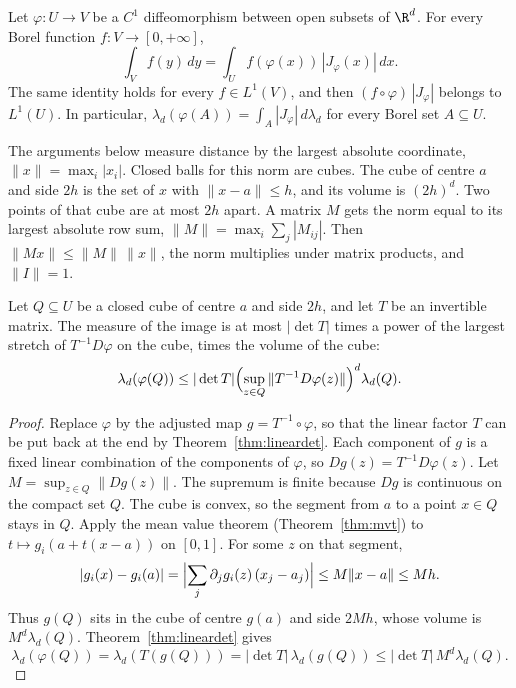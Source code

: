 \begin{theorem}\label{thm:cov}
Let $\varphi:U\to V$ be a $C^1$ diffeomorphism between open subsets of $\R^d$. For every Borel function $f:V\to[0,+\infty]$,
\[\int_Vf(y)\,dy=\int_Uf(\varphi(x))\,|J_\varphi(x)|\,dx.\]
The same identity holds for every $f\in L^1(V)$, and then $(f\circ\varphi)\,|J_\varphi|$ belongs to $L^1(U)$. In particular, $\lambda_d(\varphi(A))=\int_A|J_\varphi|\,d\lambda_d$ for every Borel set $A\subseteq U$.
\end{theorem}

The arguments below measure distance by the largest absolute coordinate, $\|x\|=\max_i|x_i|$. Closed balls for this norm are cubes. The cube of centre $a$ and side $2h$ is the set of $x$ with $\|x-a\|\le h$, and its volume is $(2h)^d$. Two points of that cube are at most $2h$ apart. A matrix $M$ gets the norm equal to its largest absolute row sum, $\|M\|=\max_i\sum_j|M_{ij}|$. Then $\|Mx\|\le\|M\|\,\|x\|$, the norm multiplies under matrix products, and $\|I\|=1$.

\begin{lemma}\label{lem:cube}
Let $Q\subseteq U$ be a closed cube of centre $a$ and side $2h$, and let $T$ be an invertible matrix. The measure of the image is at most $|\det T|$ times a power of the largest stretch of $T^{-1}D\varphi$ on the cube, times the volume of the cube:
\[\lambda_d(\varphi(Q))\le|\det T|\Bigl(\sup_{z\in Q}\|T^{-1}D\varphi(z)\|\Bigr)^d\lambda_d(Q).\]
\end{lemma}
\begin{proof}
Replace $\varphi$ by the adjusted map $g=T^{-1}\circ\varphi$, so that the linear factor $T$ can be put back at the end by Theorem~\ref{thm:lineardet}. Each component of $g$ is a fixed linear combination of the components of $\varphi$, so $Dg(z)=T^{-1}D\varphi(z)$. Let $M=\sup_{z\in Q}\|Dg(z)\|$. The supremum is finite because $Dg$ is continuous on the compact set $Q$. The cube is convex, so the segment from $a$ to a point $x\in Q$ stays in $Q$. Apply the mean value theorem (Theorem~\ref{thm:mvt}) to $t\mapsto g_i(a+t(x-a))$ on $[0,1]$. For some $z$ on that segment,
\[
|g_i(x)-g_i(a)|=\Bigl|\sum_j\partial_j g_i(z)\,(x_j-a_j)\Bigr|\le M\|x-a\|\le Mh.
\]
Thus $g(Q)$ sits in the cube of centre $g(a)$ and side $2Mh$, whose volume is $M^d\lambda_d(Q)$. Theorem~\ref{thm:lineardet} gives
\[
\lambda_d(\varphi(Q))=\lambda_d(T(g(Q)))=|\det T|\,\lambda_d(g(Q))\le|\det T|\,M^d\lambda_d(Q).
\]
\end{proof}

